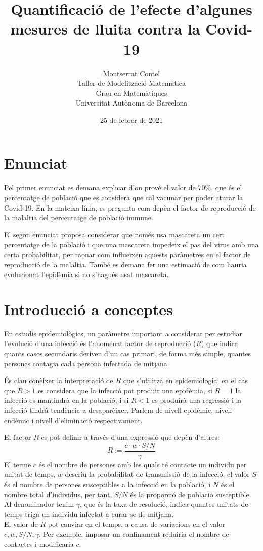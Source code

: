 \documentclass[11pt,a4paper]{article}
\author{Montserrat Contel \\ Taller de Modelització Matemàtica \\ Grau en Matemàtiques\\Universitat Autònoma de Barcelona}
\title{\textbf{Quantificació de l'efecte d'algunes mesures de lluita contra la Covid-19}}
\date{25 de febrer de 2021}
\begin{document}
	\maketitle
	\section*{Enunciat}
	Pel primer enunciat es demana explicar d'on prové el valor de $70\%$, que és el percentatge de població que es considera que cal vacunar per poder aturar la Covid-19. En la mateixa línia, es pregunta com depèn el factor de reproducció de la malaltia del percentatge de població immune.

	El segon enunciat proposa considerar que només usa mascareta un cert percentatge de la població i que una mascareta impedeix el pas del virus amb una certa probabilitat, per raonar com influeixen aquests paràmetres en el factor de reproducció de la malaltia. També es demana fer una estimació de com hauria evolucionat l'epidèmia si no s'hagués usat mascareta.
	
	\section{Introducció a conceptes}
	En estudis epidemiològics, un paràmetre important a considerar per estudiar l'evolució d'una infecció és l'anomenat factor de reproducció ($R$) que indica quants casos secundaris deriven d'un cas primari, de forma més simple, quantes persones contagia cada persona infectada de mitjana.
	
	És clau conèixer la interpretació de $R$ que s'utilitza en epidemiologia: en el cas que $R>1$ es considera que la infecció pot produir una epidèmia, si $R=1$ la infecció es mantindrà en la població, i si $R<1$ es produirà una regressió i la infecció tindrà tendència a desaparèixer. Parlem de nivell epidèmic, nivell endèmic i nivell d'eliminació respectivament.\cite{vacuna}
	
	El factor $R$ es pot definir a través d'una expressió que depèn d'altres:\cite{profe }
	\[R:=\frac{c\cdot w\cdot S/N}{\gamma}\]
	El terme $c$ és el nombre de persones amb les quals té contacte un individu per unitat de temps, $w$ descriu la probabilitat de transmissió de la infecció, el valor $S$ és el nombre de persones susceptibles a la infecció en la població, i $N$ és el nombre total d'individus, per tant, $S/N$ és la proporció de població susceptible. Al denominador tenim $\gamma$, que és la taxa de resolució, indica quantes unitats de temps triga un individu infectat a curar-se de mitjana.\\
	El valor de $R$ pot canviar en el temps, a causa de variacions en el valor $c,w,S/N,\gamma$. Per exemple, imposar un confinament reduiria el nombre de contactes i modificaria $c$.
	
\end{document}
